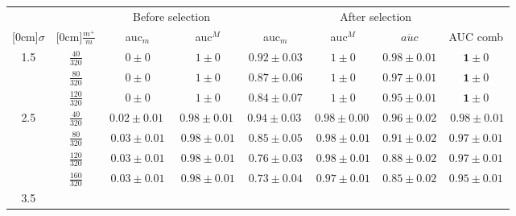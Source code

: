 \documentclass[twocolumn,english]{article}
\begin{document}
\begin{table*}[ht]
 \begin{center}
   \begin{tabular}{|cc|cc|ccc|c|}
   \hline\hline
   	& 	& \multicolumn{2}{c|}{Before selection} & \multicolumn{4}{c|}{After selection} \\
	
    \raisebox{1.5ex}[0cm]{$\sigma$} &    \raisebox{1.5ex}[0cm]{$\frac{m^+}{m}$}      & auc$_m$ & auc$^M$ &  auc$_m$ & auc$^M$ & $\overline{auc}$ & AUC comb \\
   \hline
   \multirow{3}{5mm}{1.5}
    	& $\frac{40}{320}$ & $0 \pm 0$        & $1 \pm 0$       
           & $\mathbf{0.92} \pm 0.03$		& $1 \pm 0$        & $0.98 \pm 0.01$	& $\mathbf{1} \pm 0$        \\
   	 	& $\frac{80}{320}$ & $0 \pm 0$        & $1 \pm 0$        
           & $\mathbf{0.87} \pm 0.06$		& $1 \pm 0$        & $0.97 \pm 0.01$	& $\mathbf{1} \pm 0$        \\

    	& $\frac{120}{320}$ & $0 \pm 0$        & $1 \pm 0$        
           & $\mathbf{0.84} \pm 0.07$		& $1 \pm 0$        & $0.95 \pm 0.01$	& $\mathbf{1} \pm 0$        \\

           \hline
   \multirow{4}{3mm}{2.5}

   	 	& $\frac{40}{320}$ & $~0.02 \pm 0.01~~$        & $0.98 \pm 0.01~$       
           & $\mathbf{0.94} \pm 0.03~$		& $0.98 \pm 0.00~$        & $0.96 \pm 0.02$	& $\mathbf{~0.98} \pm 0.01$        \\

   	 	& $\frac{80}{320}$ & $0.03 \pm 0.01$        & $0.98 \pm 0.01$       
           & $\mathbf{0.85} \pm 0.05$		& $0.98 \pm 0.01$        & $0.91 \pm 0.02$	& $\mathbf{0.97} \pm 0.01$        \\

    	& $\frac{120}{320}$ & $0.03 \pm 0.01$        & $0.98 \pm 0.01$        
           & $\mathbf{0.76} \pm 0.03$		& $0.98 \pm 0.01$        & $0.88 \pm 0.02$	& $\mathbf{0.97} \pm 0.01$        \\

    	& $\frac{160}{320}$ & $0.03 \pm 0.01$        & $0.98 \pm 0.01$        
           & $\mathbf{0.73} \pm 0.04$		& $0.97 \pm 0.01$        & $0.85 \pm 0.02$	& $\mathbf{0.95} \pm 0.01$        \\

           \hline
   \multirow{4}{3mm}{3.5}


\end{tabular}
\end{center}
\end{table*}
\end{document}
